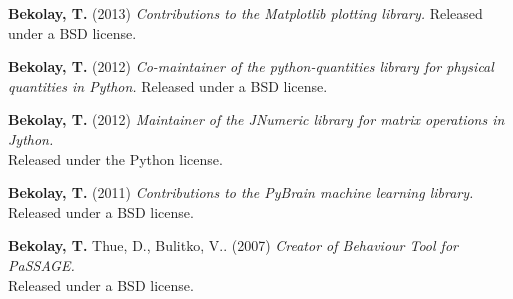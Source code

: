 \documentclass[line,margin]{res}
\begin{document}
\begin{resume}
  \textbf{Bekolay, T.} (2013)
    {\sl Contributions to the Matplotlib plotting library.}
    Released under a BSD license.

  \textbf{Bekolay, T.} (2012)
    {\sl Co-maintainer of the python-quantities library for physical quantities in Python.} Released under a BSD license.

  \textbf{Bekolay, T.} (2012)
    {\sl Maintainer of the JNumeric library for matrix operations in Jython.} \\
    Released under the Python license.

  \textbf{Bekolay, T.} (2011)
    {\sl Contributions to the PyBrain machine learning library.} \\
    Released under a BSD license.

  \textbf{Bekolay, T.} Thue, D., Bulitko, V.. (2007)
    {\sl Creator of Behaviour Tool for PaSSAGE.} \\
    Released under a BSD license.

\end{resume}
\end{document}
